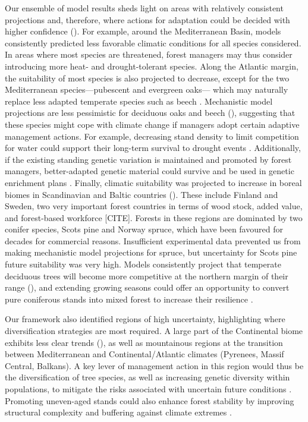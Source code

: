 \documentclass[11pt,letter]{article}
\begin{document}
Our ensemble of model results sheds light on areas with relatively consistent projections and, therefore, where actions for adaptation could be decided with higher confidence (). For example, around the Mediterranean Basin, models consistently predicted less favorable climatic conditions for all species considered. In areas where most species are threatened, forest managers may thus consider introducing more heat- and drought-tolerant species. Along the Atlantic margin, the suitability of most species is also projected to decrease, except for the two Mediterranean species---pubescent and evergreen oaks--- which may naturally replace less adapted temperate species such as beech \citep{Penuelas2003}. Mechanistic model projections are less pessimistic for deciduous oaks and beech (), suggesting that these species might cope with climate change if managers adopt certain adaptive management actions. For example, decreasing stand density to limit competition for water could support their long-term survival to drought events \citep{Young2023}. Additionally, if the existing standing genetic variation is maintained and promoted by forest managers, better-adapted genetic material could survive and be used in genetic enrichment plans \citep{Brang2014}. Finally, climatic suitability was projected to increase in boreal biomes in Scandinavian and Baltic countries (). These include Finland and Sweden, two very important forest countries in terms of wood stock, added value, and forest-based workforce [CITE]. Forests in these regions are dominated by two conifer species, Scots pine and Norway spruce, which have been favoured for decades for commercial reasons. Insufficient experimental data prevented us from making mechanistic model projections for spruce, but uncertainty for Scots pine future suitability was very high. Models consistently project that temperate deciduous trees will become more competitive at the northern margin of their range (), and extending growing seasons could offer an opportunity to convert pure coniferous stands into mixed forest to increase their resilience \citep{Schauer2023}.

Our framework also identified regions of high uncertainty, highlighting where diversification strategies are most required.
A large part of the Continental biome exhibits less clear trends (), as well as mountainous regions at the transition between Mediterranean and Continental/Atlantic climates (Pyrenees, Massif Central, Balkans). A key lever of management action in this region would thus be the diversification of tree species, as well as increasing genetic diversity within populations, to mitigate the risks associated with uncertain future conditions \citep{Morin2014, Ammer2019, Pretzsch2021, Vospernik2024}. Promoting uneven-aged stands could also enhance forest stability by improving structural complexity and buffering against climate extremes \citep{Vangi2024, Zhang2024a}.
\end{document}
